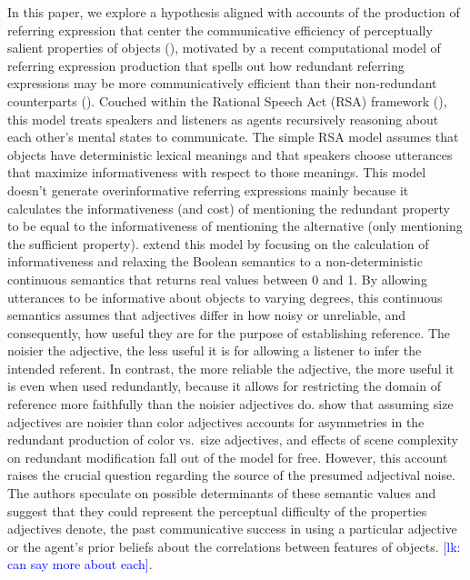 \documentclass[12pt,letterpaper]{article}
\newcommand{\lk}[1]{\textcolor{Blue}{[lk: #1]}}
\begin{document}
In this paper, we explore a hypothesis aligned with accounts of the production of referring expression that center the communicative efficiency of perceptually salient properties of objects (\citealt{EttingerFernandez2020}), motivated by a recent computational model of referring expression production that spells out how redundant referring expressions may be more communicatively efficient than their non-redundant counterparts (\citealt{DegenEtAl2020}). Couched within the Rational Speech Act (RSA) framework (\citealt{Goodman2016}), this model treats speakers and listeners as agents recursively reasoning about each other's mental states to communicate. The simple RSA model assumes that objects have deterministic lexical meanings and that speakers choose utterances that maximize informativeness with respect to those meanings. This model doesn't generate overinformative referring expressions mainly because it calculates the informativeness (and cost) of mentioning the redundant property to be equal to the informativeness of mentioning the alternative (only mentioning the sufficient property). \citet{DegenEtAl2020} extend this model by focusing on the calculation of informativeness and relaxing the Boolean semantics to a non-deterministic continuous semantics that returns real values between 0 and 1. By allowing utterances to be informative about objects to varying degrees, this continuous semantics assumes that adjectives differ in how noisy or unreliable, and consequently, how useful they are for the purpose of establishing reference. The noisier the adjective, the less useful it is for allowing a listener to infer the intended referent. In contrast, the more reliable the adjective, the more useful it is even when used redundantly, because it allows for restricting the domain of reference more faithfully than the noisier adjectives do. \citet{DegenEtAl2020} show that assuming size adjectives are noisier than color adjectives accounts for asymmetries in the redundant production of color vs.~size adjectives, and effects of scene complexity on redundant modification fall out of the model for free. However, this account raises the crucial question regarding the source of the presumed adjectival noise. The authors speculate on possible determinants of these semantic values and suggest that they could represent the perceptual difficulty of the properties adjectives denote, the past communicative success in using a particular adjective or the agent's prior beliefs about the correlations between features of objects. \lk{can say more about each}.
\end{document}
